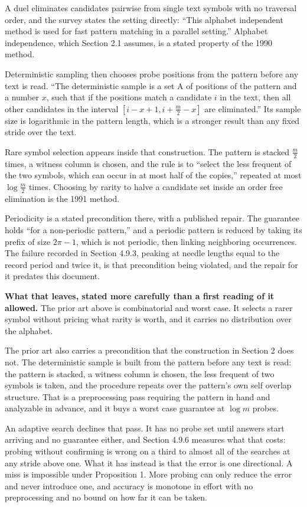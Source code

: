 A duel eliminates candidates pairwise from single text symbols with no traversal order, and the survey states the setting directly: ``This alphabet independent method is used for fast pattern matching in a parallel setting.'' Alphabet independence, which Section 2.1 assumes, is a stated property of the 1990 method.

Deterministic sampling then chooses probe positions from the pattern before any text is read. ``The deterministic sample is a set A of positions of the pattern and a number \(x\), such that if the positions match a candidate \(i\) in the text, then all other candidates in the interval \([i-x+1, i+\tfrac{m}{2}-x]\) are eliminated.'' Its sample size is logarithmic in the pattern length, which is a stronger result than any fixed stride over the text.

Rare symbol selection appears inside that construction. The pattern is stacked \(\tfrac{m}{2}\) times, a witness column is chosen, and the rule is to ``select the less frequent of the two symbols, which can occur in at most half of the copies,'' repeated at most \(\log \tfrac{m}{2}\) times. Choosing by rarity to halve a candidate set inside an order free elimination is the 1991 method.

Periodicity is a stated precondition there, with a published repair. The guarantee holds ``for a non-periodic pattern,'' and a periodic pattern is reduced by taking its prefix of size \(2\pi-1\), which is not periodic, then linking neighboring occurrences. The failure recorded in Section 4.9.3, peaking at needle lengths equal to the record period and twice it, is that precondition being violated, and the repair for it predates this document.

\noindent\textbf{What that leaves, stated more carefully than a first reading of it allowed.} The prior art above is combinatorial and worst case. It selects a rarer symbol without pricing what rarity is worth, and it carries no distribution over the alphabet.

The prior art also carries a precondition that the construction in Section 2 does not. The deterministic sample is built from the pattern before any text is read: the pattern is stacked, a witness column is chosen, the less frequent of two symbols is taken, and the procedure repeats over the pattern's own self overlap structure. That is a preprocessing pass requiring the pattern in hand and analyzable in advance, and it buys a worst case guarantee at \(\log m\) probes.

An adaptive search declines that pass. It has no probe set until answers start arriving and no guarantee either, and Section 4.9.6 measures what that costs: probing without confirming is wrong on a third to almost all of the searches at any stride above one. What it has instead is that the error is one directional. A miss is impossible under Proposition 1. More probing can only reduce the error and never introduce one, and accuracy is monotone in effort with no preprocessing and no bound on how far it can be taken.

